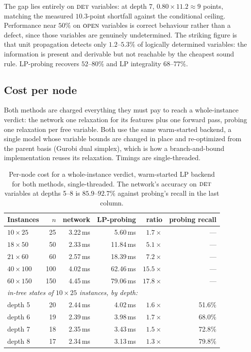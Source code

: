 \documentclass[preprint,12pt]{elsarticle}
\newcommand{\FORCED}{\textsc{det}}
\newcommand{\FREE}{\textsc{open}}
\begin{document}
The gap lies entirely on $\FORCED$ variables: at depth $7$, $0.80\times11.2\approx 9$ points, matching the measured $10.3$-point shortfall against the conditional ceiling. Performance near $50\%$ on $\FREE$ variables is correct behaviour rather than a defect, since those variables are genuinely undetermined. The striking figure is that unit propagation detects only $1.2$--$5.3\%$ of logically determined variables: the information is present and derivable but not reachable by the cheapest sound rule. LP-probing recovers $52$--$80\%$ and LP integrality $68$--$77\%$.

\subsection{Cost per node}
\label{sec:exp-cost}

Both methods are charged everything they must pay to reach a whole-instance verdict: the network one relaxation for its features plus one forward pass, probing one relaxation per free variable. Both use the same warm-started backend, a single model whose variable bounds are changed in place and re-optimized from the parent basis (Gurobi dual simplex), which is how a branch-and-bound implementation reuses its relaxation. Timings are single-threaded.

\begin{table}[h]
\centering
\begin{tabular}{lrrrrr}
\toprule
Instances & $n$ & network & LP-probing & ratio & probing recall \\
\midrule
$10\times25$ & 25 & 3.22\,ms & 5.60\,ms & $1.7\times$ & --- \\
$18\times50$ & 50 & 2.33\,ms & 11.84\,ms & $5.1\times$ & --- \\
$21\times60$ & 60 & 2.57\,ms & 18.39\,ms & $7.2\times$ & --- \\
$40\times100$ & 100 & 4.02\,ms & 62.46\,ms & $15.5\times$ & --- \\
$60\times150$ & 150 & 4.45\,ms & 79.06\,ms & $\mathbf{17.8\times}$ & --- \\
\midrule
\multicolumn{6}{l}{\emph{in-tree states of $10\times25$ instances, by depth:}} \\
depth 5 & 20 & 2.44\,ms & 4.02\,ms & $1.6\times$ & 51.6\% \\
depth 6 & 19 & 2.39\,ms & 3.98\,ms & $1.7\times$ & 68.0\% \\
depth 7 & 18 & 2.35\,ms & 3.43\,ms & $1.5\times$ & 72.8\% \\
depth 8 & 17 & 2.34\,ms & 3.13\,ms & $1.3\times$ & 79.8\% \\
\bottomrule
\end{tabular}
\caption{Per-node cost for a whole-instance verdict, warm-started LP backend for both methods, single-threaded. The network's accuracy on $\FORCED$ variables at depths 5--8 is $85.9$--$92.7\%$ against probing's recall in the last column.}
\label{tab:cost}
\end{table}
\end{document}
